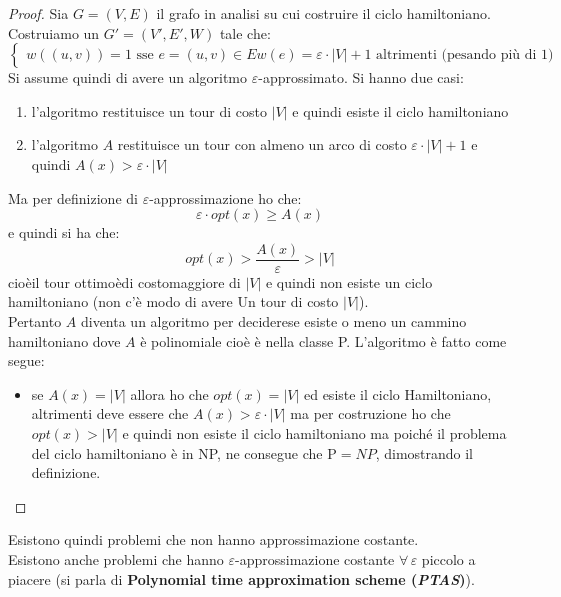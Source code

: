 																      	\begin{proof}
																      		Sia $G=(V,E)$ il grafo in analisi su cui costruire il ciclo hamiltoniano.
																      		Costruiamo un
																      		$G'=(V', E', W)$ tale che:
																      		\[
																      			\begin{cases}
																      				w((u,v)) = 1\mbox{ sse } e=(u,v) \in E                            
																      				w(e)=\varepsilon\cdot|V|+1 \mbox{ altrimenti (pesando più di 1)} 
																      			\end{cases}
																      		\]
																      		Si assume quindi  di avere un algoritmo $\varepsilon$-approssimato.
																      		Si hanno due casi:
																      		\begin{enumerate}
																      			\item l'algoritmo restituisce un tour di costo $|V|$ e quindi esiste il
																      			      ciclo hamiltoniano
																      			\item l'algoritmo $A$ restituisce un tour con almeno un arco di costo
																      			      $\varepsilon\cdot|V|+1$ e quindi $A(x)>\varepsilon\cdot |V|$
																      		\end{enumerate}
																      		Ma per definizione di $\varepsilon$-approssimazione ho che:
																      		\[\varepsilon\cdot opt(x)\geq A(x)\]
																      		e quindi si ha che:
																      		\[opt(x)>\frac{A(x)}{\varepsilon}>|V|\]
																      		cioèil tour ottimoèdi costomaggiore di $|V|$ e quindi non esiste un ciclo
																      		hamiltoniano (non c’è modo di avere Un tour di costo $|V|$).\\
																      		Pertanto $A$ diventa un algoritmo per deciderese esiste o meno un
																      		cammino hamiltoniano dove $A$ è polinomiale cioè è nella classe
																      		P. L’algoritmo è fatto come segue:
																      		\begin{itemize}
																      			\item se $A(x)=|V|$ allora ho che $opt(x)=|V|$ ed esiste il ciclo
																      			      Hamiltoniano, altrimenti deve essere che $A(x)>\varepsilon\cdot |V|$ ma per
																      			      costruzione ho che $opt(x)>|V|$ e quindi non esiste il ciclo hamiltoniano ma
																      			      poiché il problema del ciclo hamiltoniano è in NP, ne consegue che P$=NP$,
																      			      dimostrando il definizione.
																      		\end{itemize}
																      	\end{proof}
																      	Esistono quindi problemi che non hanno approssimazione costante.\\
																      	Esistono anche problemi che hanno $\varepsilon$-approssimazione costante
																      	$\forall\,\varepsilon$ piccolo a piacere (si parla di \textbf{Polynomial time
																      		approximation scheme (\textit{PTAS})}). 
